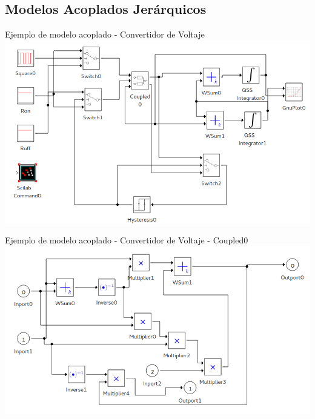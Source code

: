 \documentclass[10pt,handout]{beamer}
\begin{document}
	\subsection{Modelos Acoplados Jerárquicos }

\begin{frame}[fragile]{Ejemplo de modelo acoplado - Convertidor de Voltaje}
        \includegraphics[width=\linewidth]{buck_disk}
\end{frame}

\begin{frame}{Ejemplo de modelo acoplado - Convertidor de Voltaje - Coupled0}
        \includegraphics[width=\linewidth]{buck_disk_coupled0}
\end{frame}
\end{document}

